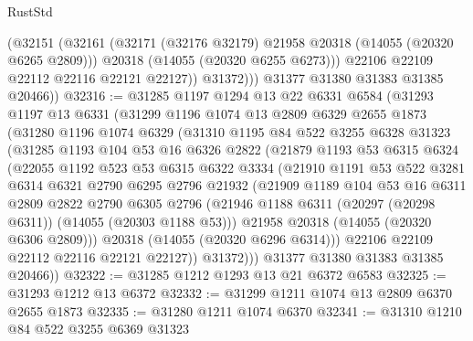 \begin{lexlean}{RustStd}
\begin{coremodule}
                (@32151
                  (@32161
                    (@32171 (@32176 @32179) @21958 @20318 (@14055 (@20320 @6265 @2809)))
                    @20318
                    (@14055 (@20320 @6255 @6273)))
                  @22106
                  @22109
                  @22112
                  @22116
                  @22121
                  @22127))
              @31372)))
        @31377
        @31380
        @31383
        @31385
        @20466))
@32316 := @31285
    @1197
    @1294
    @13
    @22
    @6331
    @6584
    (@31293
      @1197
      @13
      @6331
      (@31299
        @1196
        @1074
        @13
        @2809
        @6329
        @2655
        @1873
        (@31280
          @1196
          @1074
          @6329
          (@31310
            @1195
            @84
            @522
            @3255
            @6328
            @31323
            (@31285
              @1193
              @104
              @53
              @16
              @6326
              @2822
              (@21879
                @1193
                @53
                @6315
                @6324
                (@22055
                  @1192
                  @523
                  @53
                  @6315
                  @6322
                  @3334
                  (@21910
                    @1191
                    @53
                    @522
                    @3281
                    @6314
                    @6321
                    @2790
                    @6295
                    @2796
                    @21932
                    (@21909
                      @1189
                      @104
                      @53
                      @16
                      @6311
                      @2809
                      @2822
                      @2790
                      @6305
                      @2796
                      (@21946 @1188 @6311 (@20297 (@20298 @6311)) (@14055 (@20303 @1188 @53)))
                      @21958
                      @20318
                      (@14055 (@20320 @6306 @2809)))
                    @20318
                    (@14055 (@20320 @6296 @6314)))
                  @22106
                  @22109
                  @22112
                  @22116
                  @22121
                  @22127))
              @31372)))
        @31377
        @31380
        @31383
        @31385
        @20466))
@32322 := @31285 @1212 @1293 @13 @21 @6372 @6583
@32325 := @31293 @1212 @13 @6372
@32332 := @31299 @1211 @1074 @13 @2809 @6370 @2655 @1873
@32335 := @31280 @1211 @1074 @6370
@32341 := @31310 @1210 @84 @522 @3255 @6369 @31323

\end{coremodule}
\end{lexlean}
